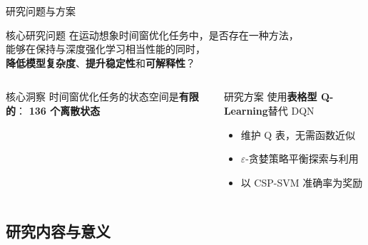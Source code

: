 \begin{frame}{研究问题与方案}
    \begin{alertblock}{核心研究问题}
        \centering
        在运动想象时间窗优化任务中，是否存在一种方法，\\
        能够在保持与深度强化学习相当性能的同时，\\
        \textbf{降低模型复杂度}、\textbf{提升稳定性}和\textbf{可解释性}？
    \end{alertblock}

    \vspace{0.3cm}
    \begin{columns}[T]
        \begin{block}{核心洞察}
            时间窗优化任务的状态空间是\textbf{有限的}：
            \vspace{0.2cm}
            \centering\Large\textbf{136 个离散状态}
        \end{block}

        \begin{block}{研究方案}
            使用\textbf{表格型 Q-Learning}\cite{watkins1992q}替代 DQN
            \begin{itemize}
                \item 维护 Q 表，无需函数近似
                \item $\varepsilon$-贪婪策略平衡探索与利用
                \item 以 CSP-SVM 准确率为奖励
            \end{itemize}
        \end{block}
    \end{columns}
\end{frame}

\subsection{研究内容与意义}

